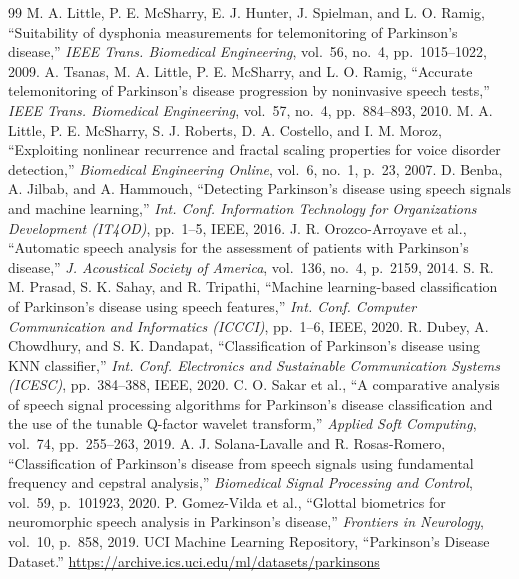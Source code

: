 \documentclass[oneside,a4paper,12pt]{report}
\begin{document}
\begin{thebibliography}{99}
 M. A. Little, P. E. McSharry, E. J. Hunter, J. Spielman, and L. O. Ramig, ``Suitability of dysphonia measurements for telemonitoring of Parkinson's disease,'' \textit{IEEE Trans. Biomedical Engineering}, vol.\ 56, no.\ 4, pp.\ 1015--1022, 2009.
 A. Tsanas, M. A. Little, P. E. McSharry, and L. O. Ramig, ``Accurate telemonitoring of Parkinson's disease progression by noninvasive speech tests,'' \textit{IEEE Trans. Biomedical Engineering}, vol.\ 57, no.\ 4, pp.\ 884--893, 2010.
 M. A. Little, P. E. McSharry, S. J. Roberts, D. A. Costello, and I. M. Moroz, ``Exploiting nonlinear recurrence and fractal scaling properties for voice disorder detection,'' \textit{Biomedical Engineering Online}, vol.\ 6, no.\ 1, p.\ 23, 2007.
 D. Benba, A. Jilbab, and A. Hammouch, ``Detecting Parkinson's disease using speech signals and machine learning,'' \textit{Int. Conf. Information Technology for Organizations Development (IT4OD)}, pp.\ 1--5, IEEE, 2016.
 J. R. Orozco-Arroyave et al., ``Automatic speech analysis for the assessment of patients with Parkinson's disease,'' \textit{J. Acoustical Society of America}, vol.\ 136, no.\ 4, p.\ 2159, 2014.
 S. R. M. Prasad, S. K. Sahay, and R. Tripathi, ``Machine learning-based classification of Parkinson's disease using speech features,'' \textit{Int. Conf. Computer Communication and Informatics (ICCCI)}, pp.\ 1--6, IEEE, 2020.
 R. Dubey, A. Chowdhury, and S. K. Dandapat, ``Classification of Parkinson's disease using KNN classifier,'' \textit{Int. Conf. Electronics and Sustainable Communication Systems (ICESC)}, pp.\ 384--388, IEEE, 2020.
 C. O. Sakar et al., ``A comparative analysis of speech signal processing algorithms for Parkinson's disease classification and the use of the tunable Q-factor wavelet transform,'' \textit{Applied Soft Computing}, vol.\ 74, pp.\ 255--263, 2019.
 A. J. Solana-Lavalle and R. Rosas-Romero, ``Classification of Parkinson's disease from speech signals using fundamental frequency and cepstral analysis,'' \textit{Biomedical Signal Processing and Control}, vol.\ 59, p.\ 101923, 2020.
 P. Gomez-Vilda et al., ``Glottal biometrics for neuromorphic speech analysis in Parkinson's disease,'' \textit{Frontiers in Neurology}, vol.\ 10, p.\ 858, 2019.
 UCI Machine Learning Repository, ``Parkinson's Disease Dataset.'' \url{https://archive.ics.uci.edu/ml/datasets/parkinsons}

\end{thebibliography}
\end{document}
